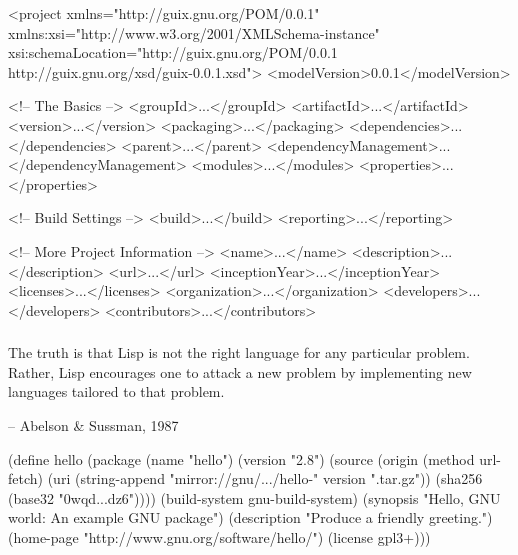 \documentclass{beamer}
\begin{document}
\begin{frame}
  \begin{semiverbatim}
    \footnotesize{
<project xmlns="http://guix.gnu.org/POM/0.0.1"
  xmlns:xsi="http://www.w3.org/2001/XMLSchema-instance"
  xsi:schemaLocation="http://guix.gnu.org/POM/0.0.1
                      http://guix.gnu.org/xsd/guix-0.0.1.xsd">
  <modelVersion>0.0.1</modelVersion>

  <!-- The Basics -->
  <groupId>...</groupId>
  <artifactId>...</artifactId>
  <version>...</version>
  <packaging>...</packaging>
  <dependencies>...</dependencies>
  <parent>...</parent>
  <dependencyManagement>...</dependencyManagement>
  <modules>...</modules>
  <properties>...</properties>

  <!-- Build Settings -->
  <build>...</build>
  <reporting>...</reporting>

  <!-- More Project Information -->
  <name>...</name>
  <description>...</description>
  <url>...</url>
  <inceptionYear>...</inceptionYear>
  <licenses>...</licenses>
  <organization>...</organization>
  <developers>...</developers>
  <contributors>...</contributors>
}
  \end{semiverbatim}
\end{frame}

\begin{frame}[plain]
  \frametitle{}
  
  \vspace{0.5cm}
  \textrm{\LARGE{%
      The truth is that Lisp is not the right language for
      any particular problem.  Rather, Lisp encourages one to attack a
      new problem by implementing new languages tailored to that
      problem.  }}

  \vspace{1cm}
  \hfill{-- Abelson \& Sussman, 1987}
\end{frame}

\begin{frame}[fragile]
  \begin{semiverbatim}
    \small{
(define hello
  (\alert{package}
   (name "hello")
   (version "2.8")
   (source (\alert{origin}
            (method url-fetch)
            (uri (string-append
                  "mirror://gnu/\textrm{...}/hello-" version
                  ".tar.gz"))
            (sha256 (base32 "0wqd\textrm{...}dz6"))))
   (\alert{build-system} gnu-build-system)
   (synopsis "Hello, GNU world: An example GNU package")
   (description "Produce a friendly greeting.")
   (home-page "http://www.gnu.org/software/hello/")
   (license gpl3+)))
}
  \end{semiverbatim}

\end{frame}
\end{document}
